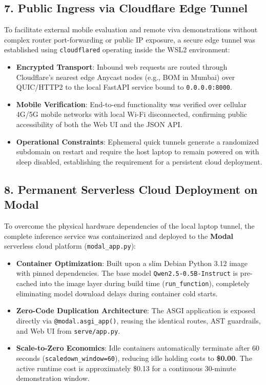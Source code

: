 \documentclass[11pt,a4paper]{report}
\begin{document}
\subsection{7. Public Ingress via Cloudflare Edge Tunnel}
To facilitate external mobile evaluation and remote viva demonstrations without complex router port-forwarding or public IP exposure, a secure edge tunnel was established using \texttt{cloudflared} operating inside the WSL2 environment:
\begin{itemize}
    \item \textbf{Encrypted Transport}: Inbound web requests are routed through Cloudflare's nearest edge Anycast nodes (e.g., BOM in Mumbai) over QUIC/HTTP2 to the local FastAPI service bound to \texttt{0.0.0.0:8000}.
    \item \textbf{Mobile Verification}: End-to-end functionality was verified over cellular 4G/5G mobile networks with local Wi-Fi disconnected, confirming public accessibility of both the Web UI and the JSON API.
    \item \textbf{Operational Constraints}: Ephemeral quick tunnels generate a randomized subdomain on restart and require the host laptop to remain powered on with sleep disabled, establishing the requirement for a persistent cloud deployment.
\end{itemize}

\subsection{8. Permanent Serverless Cloud Deployment on Modal}
To overcome the physical hardware dependencies of the local laptop tunnel, the complete inference service was containerized and deployed to the \textbf{Modal} serverless cloud platform (\texttt{modal\_app.py}):
\begin{itemize}
    \item \textbf{Container Optimization}: Built upon a slim Debian Python 3.12 image with pinned dependencies. The base model \texttt{Qwen2.5-0.5B-Instruct} is pre-cached into the image layer during build time (\texttt{run\_function}), completely eliminating model download delays during container cold starts.
    \item \textbf{Zero-Code Duplication Architecture}: The ASGI application is exposed directly via \texttt{@modal.asgi\_app()}, reusing the identical routes, AST guardrails, and Web UI from \texttt{serve/app.py}.
    \item \textbf{Scale-to-Zero Economics}: Idle containers automatically terminate after 60 seconds (\texttt{scaledown\_window=60}), reducing idle holding costs to \textbf{\$0.00}. The active runtime cost is approximately \$0.13 for a continuous 30-minute demonstration window.
\end{itemize}
\end{document}

